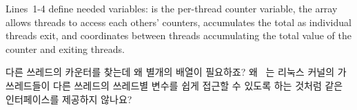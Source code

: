 Lines~1-4 define needed variables:  is the per-thread counter
variable, the  array allows threads to access each others'
counters,  accumulates the total as individual threads exit,
and  coordinates between threads accumulating the total
value of the counter and exiting threads.
\fi

\QuickQuiz{}
	다른 쓰레드의 카운터를 찾는데 왜 별개의 배열이 필요하죠?
	왜 \GCC\ 는 리눅스 커널의  가 쓰레드들이 다른 쓰레드의
	쓰레드별 변수를 쉽게 접근할 수 있도록 하는 것처럼 
	같은 인터페이스를 제공하지 않나요?

